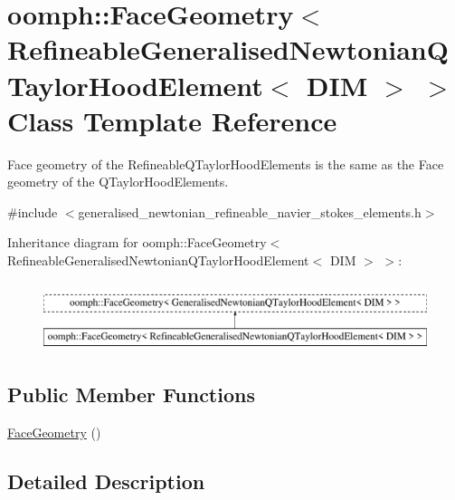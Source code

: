 \hypertarget{classoomph_1_1FaceGeometry_3_01RefineableGeneralisedNewtonianQTaylorHoodElement_3_01DIM_01_4_01_4}{}\section{oomph\+:\+:Face\+Geometry$<$ Refineable\+Generalised\+Newtonian\+Q\+Taylor\+Hood\+Element$<$ D\+IM $>$ $>$ Class Template Reference}
\label{classoomph_1_1FaceGeometry_3_01RefineableGeneralisedNewtonianQTaylorHoodElement_3_01DIM_01_4_01_4}


Face geometry of the Refineable\+Q\+Taylor\+Hood\+Elements is the same as the Face geometry of the Q\+Taylor\+Hood\+Elements.  




{\ttfamily \#include $<$generalised\+\_\+newtonian\+\_\+refineable\+\_\+navier\+\_\+stokes\+\_\+elements.\+h$>$}

Inheritance diagram for oomph\+:\+:Face\+Geometry$<$ Refineable\+Generalised\+Newtonian\+Q\+Taylor\+Hood\+Element$<$ D\+IM $>$ $>$\+:\begin{figure}[H]
\begin{center}
\leavevmode
\includegraphics[height=2.000000cm]{classoomph_1_1FaceGeometry_3_01RefineableGeneralisedNewtonianQTaylorHoodElement_3_01DIM_01_4_01_4}
\end{center}
\end{figure}
\subsection*{Public Member Functions}
\begin{DoxyCompactItemize}
\item 
\hyperlink{classoomph_1_1FaceGeometry_3_01RefineableGeneralisedNewtonianQTaylorHoodElement_3_01DIM_01_4_01_4_a192cea887d1dd7b1740e1a37ee3406b7}{Face\+Geometry} ()
\end{DoxyCompactItemize}


\subsection{Detailed Description}
